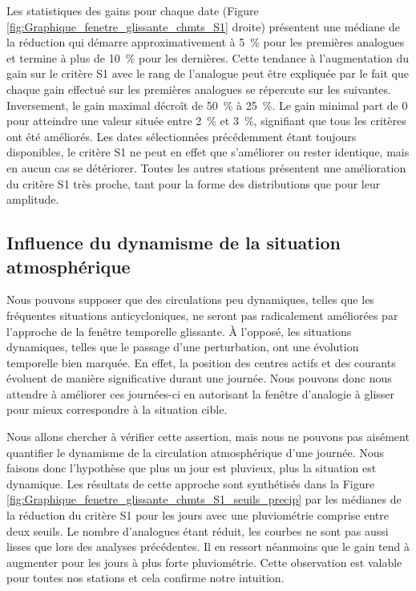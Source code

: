 \documentclass[hess]{copernicus}
\begin{document}
Les statistiques des gains pour chaque date (Figure \ref{fig:Graphique_fenetre_glissante_chmts_S1} droite) présentent une médiane de la réduction qui démarre approximativement à 5~\% pour les premières analogues et termine à plus de 10~\% pour les dernières. Cette tendance à l'augmentation du gain sur le critère S1 avec le rang de l'analogue peut être expliquée par le fait que chaque gain effectué sur les premières analogues se répercute sur les suivantes. Inversement, le gain maximal décroît de 50~\% à 25~\%. Le gain minimal part de 0 pour atteindre une valeur située entre 2~\% et 3~\%, signifiant que tous les critères ont été améliorés. Les dates sélectionnées précédemment étant toujours disponibles, le critère S1 ne peut en effet que s'améliorer ou rester identique, mais en aucun cas se détériorer. Toutes les autres stations présentent une amélioration du critère S1 très proche, tant pour la forme des distributions que pour leur amplitude.



\subsection{Influence du dynamisme de la situation atmosphérique}
\label{sec:ameliorations:fenetre:S1_pluie}

Nous pouvons supposer que des circulations peu dynamiques, telles que les fréquentes situations anticycloniques, ne seront pas radicalement améliorées par l'approche de la fenêtre temporelle glissante. À l'opposé, les situations dynamiques, telles que le passage d'une perturbation, ont une évolution temporelle bien marquée. En effet, la position des centres actifs et des courants évoluent de manière significative durant une journée. Nous pouvons donc nous attendre à améliorer ces journées-ci en autorisant la fenêtre d'analogie à glisser pour mieux correspondre à la situation cible.

Nous allons chercher à vérifier cette assertion, mais nous ne pouvons pas aisément quantifier le dynamisme de la circulation atmosphérique d'une journée. Nous faisons donc l'hypothèse que plus un jour est pluvieux, plus la situation est dynamique. Les résultats de cette approche sont synthétisés dans la Figure \ref{fig:Graphique_fenetre_glissante_chmts_S1_seuils_precip} par les médianes de la réduction du critère S1 pour les jours avec une pluviométrie comprise entre deux seuils. Le nombre d'analogues étant réduit, les courbes ne sont pas aussi lisses que lors des analyses précédentes. Il en ressort néanmoins que le gain tend à augmenter pour les jours à plus forte pluviométrie. Cette observation est valable pour toutes nos stations et cela confirme notre intuition.
\end{document}
